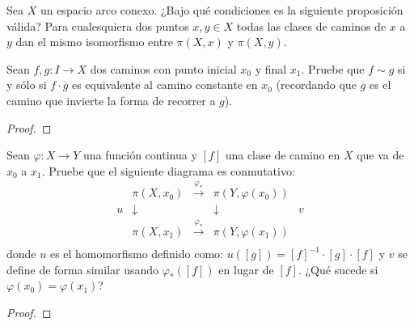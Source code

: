 \documentclass[12pt]{report}
\theoremstyle{largebreak}
\newcommand\cf[3]{\ensuremath{#1:#2\rightarrow#3}}
\begin{document}
    \begin{sol}
        
    \end{sol}

    \begin{excer}
        Sea $X$ un espacio arco conexo. ¿Bajo qué condiciones es la siguiente proposición válida? Para cualesquiera dos puntos $x,y\in X$ todas las clases de caminos de $x$ a $y$ dan el mismo isomorfismo entre $\pi(X,x)$ y $\pi(X,y)$. 
    \end{excer}

    \begin{sol}
        
    \end{sol}

    \begin{excer}
        Sean $\cf{f,g}{I}{X}$ dos caminos con punto inicial $x_0$ y final $x_1$. Pruebe que $f\sim g$ si y sólo si $f\cdot\overline{g}$ es equivalente al camino constante en $x_0$ (recordando que $\overline{g}$ es el camino que invierte la forma de recorrer a $g$).
    \end{excer}

    \begin{proof}
        
    \end{proof}

    \begin{excer}
        Sean $\cf{\varphi}{X}{Y}$ una función continua y $[f]$ una clase de camino en $X$ que va de $x_0$ a $x_1$. Pruebe que el siguiente diagrama es conmutativo:
        \begin{equation*}
            \begin{array}{rcccl}
              & \pi(X,x_0) & \overset{\varphi_*}{\longrightarrow} & \pi(Y,\varphi(x_0)) & \\
              u & \downarrow & & \downarrow & v \\
               & \pi(X,x_1) & \overset{\varphi_*}{\longrightarrow} & \pi(Y,\varphi(x_1)) & \\
            \end{array}
        \end{equation*}
        donde $u$ es el homomorfismo definido como: $u([g])=[f]^{-1}\cdot[g]\cdot[f]$ y $v$ se define de forma similar usando $\varphi_*([f])$ en lugar de $[f]$. ¿Qué sucede si $\varphi(x_0)=\varphi(x_1)$?
    \end{excer}

    \begin{proof}
        
    \end{proof}
\end{document}
